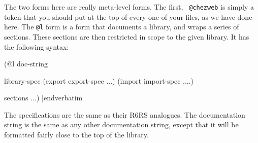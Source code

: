 %
The two forms here are really meta-level forms.  The first, {\tt
@chezweb} is simply a token that you should put at the top of every
one of your files, as we have done here.  The {\tt @l} form is a form
that documents a library, and wraps a series of sections.  These
sections are then restricted in scope to the given library.  It has
the following syntax:

\medskip\verbatim
(@l doc-string

library-spec
(export export-spec ...)
(import import-spec ....)

sections ...)
|endverbatim
\medskip

\noindent
The specifications are the same as their R6RS analogues.  The
documentation string is the same as any other documentation string,
except that it will be formatted fairly close to the top of the
library.

\bye
